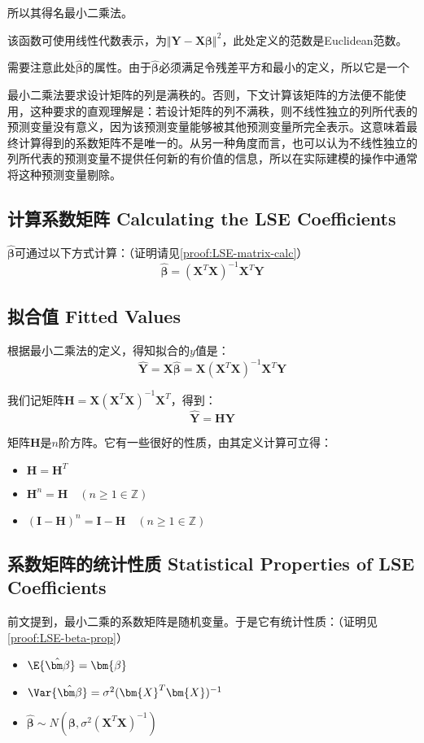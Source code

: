 \documentclass{MGLSA-cn-book-math}
\begin{document}
所以其得名最小二乘法。

该函数可使用线性代数表示，为$\Vert\bm{Y}-\bm{X\beta}\Vert^2$，此处定义的范数是Euclidean范数。

需要注意此处$\hat{\bm\beta}$的属性。由于$\hat{\bm\beta}$必须满足令残差平方和最小的定义，所以它是一个

最小二乘法要求设计矩阵的列是满秩的。否则，下文计算该矩阵的方法便不能使用，这种要求的直观理解是：若设计矩阵的列不满秩，则不线性独立的列所代表的预测变量没有意义，因为该预测变量能够被其他预测变量所完全表示。这意味着最终计算得到的系数矩阵不是唯一的。从另一种角度而言，也可以认为不线性独立的列所代表的预测变量不提供任何新的有价值的信息，所以在实际建模的操作中通常将这种预测变量剔除。

\subsection{计算系数矩阵 Calculating the LSE Coefficients}
$\hat{\bm\beta}$可通过以下方式计算：（证明请见\ref{proof:LSE-matrix-calc}）
\[
	\bm{\hat\beta}=(\bm{X}^T\bm{X})^{-1}\bm{X}^T\bm{Y}
\]

\subsection{拟合值 Fitted Values}
根据最小二乘法的定义，得知拟合的$y$值是：
\[
	\bm{\hat Y}=\bm{X}\hat{\bm{\beta}}=\bm{X}(\bm{X}^T\bm{X})^{-1}\bm{X}^T\bm{Y}
\]

我们记矩阵$\bm{H}=\bm{X}(\bm{X}^T\bm{X})^{-1}\bm{X}^T$，得到：
\[
	\bm{\hat Y}=\bm{H}\bm{Y}
\]

矩阵$\bm{H}$是$n$阶方阵。它有一些很好的性质，由其定义计算可立得：
\begin{itemize}
	\item $\bm{H}=\bm{H}^T$
	\item $\bm{H}^n=\bm{H}\quad (n\geq 1\in\mathbb{Z})$
	\item $(\bm{I}-\bm{H})^n=\bm{I}-\bm{H}\quad (n\geq 1\in\mathbb{Z})$
\end{itemize}

\subsection{系数矩阵的统计性质 Statistical Properties of LSE Coefficients}
前文提到，最小二乘的系数矩阵是随机变量。于是它有统计性质：（证明见\ref{proof:LSE-beta-prop}）
\begin{itemize}
	\item $\E{\hat{\bm\beta}}=\bm{\beta}$
	\item $\Var{\hat{\bm\beta}}=\sigma^2(\bm{X}^T\bm{X})^{-1}$
	\item $\hat{\bm\beta}\sim N(\bm{\beta}, \sigma^2(\bm{X}^T\bm{X})^{-1})$
\end{itemize}
\end{document}
